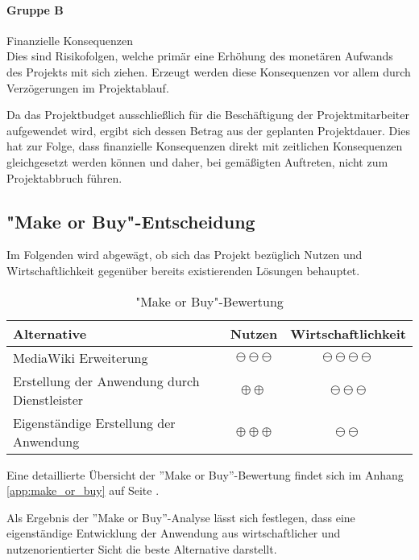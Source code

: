 \documentclass[12pt, xcolor=dvipsnames]{scrartcl}
\begin{document}
\paragraph{Gruppe B} Finanzielle Konsequenzen \\
Dies sind Risikofolgen, welche primär eine Erhöhung des monetären Aufwands des Projekts mit sich ziehen. Erzeugt werden diese Konsequenzen vor allem durch Verzögerungen im Projektablauf.

Da das Projektbudget ausschließlich für die Beschäftigung der Projektmitarbeiter aufgewendet wird, ergibt sich dessen Betrag aus der geplanten Projektdauer. Dies hat zur Folge, dass finanzielle Konsequenzen direkt mit zeitlichen Konsequenzen gleichgesetzt werden können und daher, bei gemäßigten Auftreten, nicht zum Projektabbruch führen.


\subsection{"Make or Buy"-Entscheidung}

Im Folgenden wird abgewägt, ob sich das Projekt bezüglich Nutzen und Wirtschaftlichkeit gegenüber bereits existierenden Lösungen behauptet.


\begin{table}[H]
	\centering
	\begin{tabular}{lcc}

		\rowcolor{white!15}				
		\textbf{Alternative} & \textbf{Nutzen} & \textbf{Wirtschaftlichkeit} \\\hline		
				
		MediaWiki Erweiterung & $\ominus\ominus\ominus$ & $\ominus\ominus\ominus\ominus$ \\		
		Erstellung der Anwendung durch Dienstleister & $\oplus\oplus$ & $\ominus\ominus\ominus$ \\		
		Eigenständige Erstellung der Anwendung & $\oplus\oplus\oplus$ & $\ominus\ominus$ \\
	
			    
	\end{tabular}
	\caption{"Make or Buy"-Bewertung}
	\label{tab:make_or_buy}
\end{table}

Eine detaillierte Übersicht der ''Make or Buy''-Bewertung findet sich im Anhang \ref{app:make_or_buy} auf Seite \pageref{app:make_or_buy}.


Als Ergebnis der ''Make or Buy''-Analyse lässt sich festlegen, dass eine eigenständige Entwicklung der Anwendung aus wirtschaftlicher und nutzenorientierter Sicht die beste Alternative darstellt.
\end{document}
